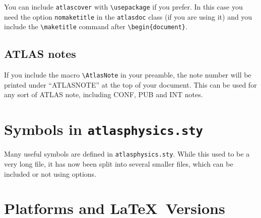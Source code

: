 \documentclass[koma,UKenglish]{style/atlasdoc}
\newcommand{\Macro}[1]{\texttt{\textbackslash #1}\xspace}
\begin{document}
You can include \texttt{atlascover} with \Macro{usepackage} if you prefer.
In this case you need the option \texttt{nomaketitle} in the \texttt{atlasdoc} class
(if you are using it)
and you include the \Macro{maketitle} command after \verb|\begin{document}|.

\subsection{ATLAS notes}
\label{sec:note}

If you include the macro \Macro{AtlasNote} in your preamble,
the note number will be printed under ``ATLASNOTE'' at the top of your document.
This can be used for any sort of ATLAS note, including CONF, PUB and INT notes.


\section{Symbols in \texttt{atlasphysics.sty}}
\label{sec:atlasphysics}

Many useful symbols are defined in \texttt{atlasphysics.sty}.
While this used to be a very long file, it has now been split into several smaller files,
which can be included or not using options.


\section{Platforms and \LaTeX\ Versions}
\label{sec:version}
\end{document}
